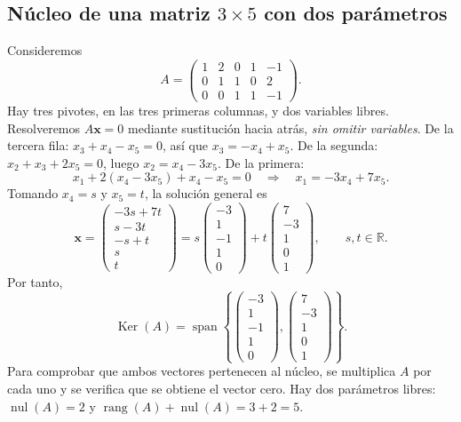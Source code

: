 \documentclass[12pt]{article}
\theoremstyle{remark}
\newcommand{\R}{\mathbb{R}}
\newcommand{\rang}{\operatorname{rang}}
\newcommand{\nul}{\operatorname{nul}}
\newcommand{\Ker}{\operatorname{Ker}}
\newcommand{\vect}[1]{\boldsymbol{#1}}
\begin{document}
\subsection{Núcleo de una matriz $3\times5$ con dos parámetros}
Consideremos
\[
A=\begin{pmatrix}1&2&0&1&-1\\0&1&1&0&2\\0&0&1&1&-1\end{pmatrix}.
\]
Hay tres pivotes, en las tres primeras columnas, y dos variables libres. Resolveremos $A\vect x=0$ mediante sustitución hacia atrás, \emph{sin omitir variables}.
De la tercera fila: $x_3+x_4-x_5=0$, así que $x_3=-x_4+x_5$. De la segunda: $x_2+x_3+2x_5=0$, luego $x_2=x_4-3x_5$. De la primera:
\[
x_1+2(x_4-3x_5)+x_4-x_5=0\quad\Longrightarrow\quad x_1=-3x_4+7x_5.
\]
Tomando $x_4=s$ y $x_5=t$, la solución general es
\[
\vect x=\begin{pmatrix}-3s+7t\\s-3t\\-s+t\\s\\t\end{pmatrix}
=s\begin{pmatrix}-3\\1\\-1\\1\\0\end{pmatrix}
+t\begin{pmatrix}7\\-3\\1\\0\\1\end{pmatrix},\qquad s,t\in\R.
\]
Por tanto,
\[
\boxed{\Ker(A)=\operatorname{span}\left\{
\begin{pmatrix}-3\\1\\-1\\1\\0\end{pmatrix},
\begin{pmatrix}7\\-3\\1\\0\\1\end{pmatrix}\right\}.}
\]
Para comprobar que ambos vectores pertenecen al núcleo, se multiplica $A$ por cada uno y se verifica que se obtiene el vector cero. Hay dos parámetros libres: $\nul(A)=2$ y $\rang(A)+\nul(A)=3+2=5$.
\end{document}
